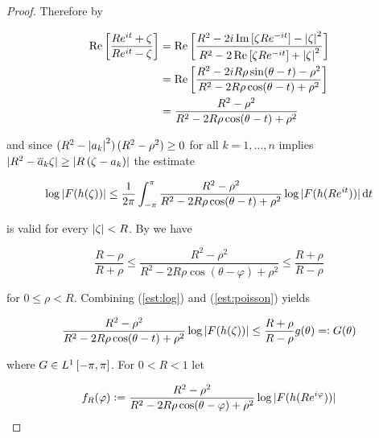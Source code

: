 \begin{proof}
	Therefore by

	\begin{equation*}
		\begin{aligned}
			\Re \sbr[3]{\frac{R e^{it} + \zeta}{R e^{it} - \zeta}} &= \Re \sbr[3]{\frac{R^2 - 2i \Im \sbr[0]{ \zeta R e^{-it} } - \abs[0]{ \zeta }^2}{R^2 - 2\Re \sbr[0]{ \zeta R e^{-it} } + \abs[0]{ \zeta }^2}}\\ &= \Re \sbr[3]{\frac{R^2 - 2iR\rho \sin( \theta - t ) - \rho^2 }{R^2 - 2R\rho \cos( \theta - t ) + \rho^2}}\\
			&= \frac{R^2 - \rho^2}{R^2 - 2R\rho \cos( \theta - t ) + \rho^2}
		\end{aligned}
	\end{equation*}

	\noindent and since $\del[0]{ R^2 - \abs[0]{ a_k }^2 }\del[0]{ R^2 - \rho^2 }\geq 0$ for all $k = 1,\dots,n$ implies $\abs[0]{ R^2 - \overline{a}_k\zeta } \geq \abs[0]{ R\del[0]{ \zeta - a_k}}$ the estimate 

	\begin{equation}
		\log\abs[0]{ F(h(\zeta))} \leq \frac{1}{2\pi}\int_{-\pi}^\pi \frac{R^2 - \rho^2}{R^2 - 2R\rho \cos( \theta - t ) + \rho^2}\log\abs[0]{ F(h(R e^{it}))}\d t
	\end{equation}

	\noindent is valid for every $\abs[0]{ \zeta } < R$. By \cite[236]{rudin:rc_analysis:1987} we have

	\begin{equation}
		\frac{R - \rho}{R + \rho} \leq \frac{R^2 - \rho^2}{R^2 - 2R\rho\cos(\theta - \varphi) + \rho^2} \leq \frac{R + \rho}{R - \rho}
		\label{est:poisson}
	\end{equation}
	
	\noindent for $0 \leq \rho < R$. Combining (\ref{est:log}) and (\ref{est:poisson}) yields 

\begin{equation}
	\frac{R^2 - \rho^2}{R^2 - 2R\rho \cos( \theta - t ) + \rho^2}\log\abs[0]{ F(h(\zeta))} \leq \frac{R + \rho}{R - \rho}g( \theta ) =: G( \theta )
\end{equation}

\noindent where $G \in L^1\intcc{-\pi,\pi}$. For $0 < R < 1$ let

\begin{equation*}
	f_R(\varphi) := \frac{R^2 - \rho^2}{R^2 - 2R\rho\cos(\theta - \varphi) + \rho^2}\log\abs[0]{ F(h(Re^{i\varphi}))}
\end{equation*}


\end{proof}
